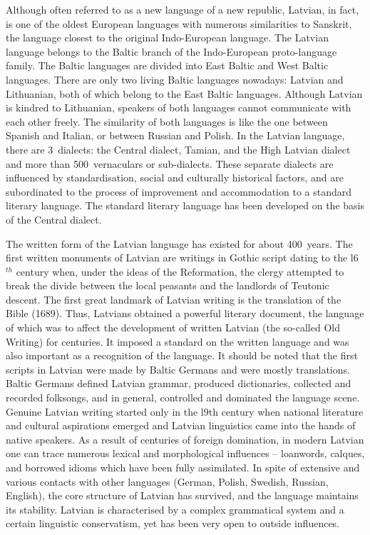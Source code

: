 \begin{multicols}{2}
Although often referred to as a new language of a new republic, Latvian, in fact, is one of the oldest European languages with numerous similarities to Sanskrit, the language closest to the original Indo-European language.
The Latvian language belongs to the Baltic branch of the Indo-European  proto-language family.
The Baltic languages are divided into East Baltic and West Baltic languages.
There are only two living Baltic languages nowadays: Latvian and Lithuanian, both of which belong to the East Baltic languages.
Although Latvian is kindred to Lithuanian, speakers of both languages cannot communicate with each other freely.
The similarity of both languages is like the one between Spanish and Italian, or between Russian and Polish.
In the Latvian language, there are 3~dialects: the Central dialect, Tamian, and the High Latvian dialect and more than 500~vernaculars or sub-dialects.
These separate dialects are influenced by standardisation, social and culturally historical factors, and are subordinated to the process of improvement and accommodation to a standard literary language.
The standard literary language has been developed on the basis of the Central dialect. 

The written form of the Latvian language has existed for about 400~years.
The first written monuments of Latvian are writings in Gothic script dating to the l6${}^{th}$ century when, under the ideas of the Reformation, the clergy attempted to break the divide between the local peasants and the landlords of Teutonic descent.
The first great landmark of Latvian writing is the translation of the Bible (1689).
Thus, Latvians obtained a powerful literary document, the language of which was to affect the development of written Latvian (the so-called Old Writing) for centuries.
It imposed a standard on the written language and was also important as a recognition of the language.
It should be noted that the first scripts in Latvian were made by Baltic Germans and were mostly translations.
Baltic Germans defined Latvian grammar, produced dictionaries, collected and recorded folksongs, and in general, controlled and dominated the language scene.
Genuine Latvian writing started only in the l9th century when national literature and cultural aspirations emerged and Latvian linguistics came into the hands of native speakers.
As a result of centuries of foreign domination, in modern Latvian one can trace numerous lexical and morphological influences -- loanwords, calques, and borrowed idioms which have been fully assimilated.
In spite of extensive and various contacts with other languages (German, Polish, Swedish, Russian, English), the core structure of Latvian has survived, and the language maintains its stability.
Latvian is characterised by a complex grammatical system and a certain linguistic conservatism, yet has been very open to outside influences.


\end{multicols}
